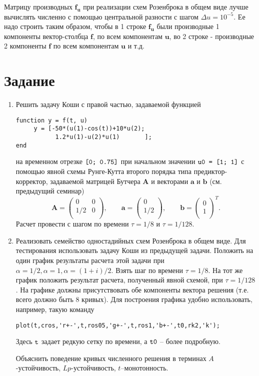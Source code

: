 Матрицу производных $\mathbf{f_u}$ при реализации схем Розенброка в общем виде лучше вычислять численно с помощью центральной разности с шагом $\Delta u = 10^{-5}$. Ее надо строить таким образом, чтобы в 1 строке $\mathbf{f_u}$ были производные 1 компоненты вектор-столбца $\mathbf{f}$, по всем компонентам $\mathbf{u}$, во 2 строке - производные 2 компоненты $\mathbf{f}$ по всем компонентам $\mathbf{u}$ и т.д.

\section{Задание}
\begin{enumerate}
\item Решить задачу Коши с правой частью, задаваемой функцией
\begin{matlablisting}
	\begin{verbatim}
function y = f(t, u)
     y = [-50*(u(1)-cos(t))+10*u(2); 
           1.2*u(1)-u(2)*u(1)       ];
end		
	\end{verbatim}
\end{matlablisting}
на временном отрезке $\texttt{\lstinline|[0; 0.75]|}$
при начальном значении $\texttt{\lstinline|u0 = [1; 1]|}$ с помощью явной схемы Рунге-Кутта второго порядка типа предиктор-корректор, задаваемой матрицей Бутчера $\mathbf{A}$ и векторами $\mathbf{a}$ и $\mathbf{b}$ (см. предыдущий семинар)
\begin{equation} \nonumber
	\mathbf{A} = 
		\begin{pmatrix}
		0 & 0 \\
		1/2 & 0 \\
		\end{pmatrix},
	\qquad
	\mathbf{a} = 
		\begin{pmatrix}
		0 \\
		1/2 \\
		\end{pmatrix},
	\qquad
	\mathbf{b} = 
		\begin{pmatrix}
		0 \\
		1 \\
		\end{pmatrix}^T.
\end{equation}
Расчет провести с шагом по времени $\tau = 1/8$ и $\tau = 1/128$.
\item Реализовать семейство одностадийных схем Розенброка в общем виде. Для тестирования использовать задачу Коши из предыдущей задачи. Положить на один график результаты расчета этой задачи при $\alpha = 1/2, \alpha = 1, \alpha = (1+i)/2$. Взять шаг по времени $\tau = 1/8$. На тот же график положить результат расчета, полученный явной схемой, при $\tau = 1/128$. На графике должны присутствовать обе компоненты вектора решения (т.е. всего должно быть 8 кривых). Для построения графика удобно использовать, например, такую команду
\begin{matlablisting}
	\begin{verbatim}
plot(t,cros,'r+-',t,ros05,'g+-',t,ros1,'b+-',t0,rk2,'k');
	\end{verbatim}
\end{matlablisting}
Здесь $\texttt{\lstinline|t|}$ задает редкую сетку по времени, а $\texttt{\lstinline|t0|}$ – более подробную. 

Объяснить поведение кривых численного решения в терминах $A$-устойчивость, $Lp$-устойчивость, $t$–монотонность.

\end{enumerate}